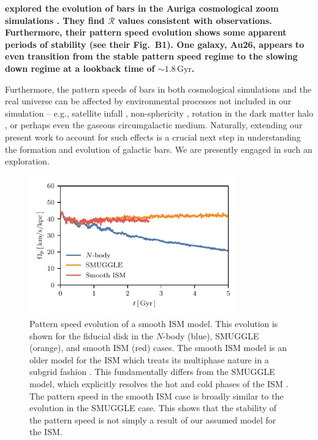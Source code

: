 \documentclass[twocolumn,linenumbers,trackchanges]{aastex631}
\newcommand{\Rot}{\ensuremath{\mathcal{R}}}
\newcommand{\Nbody}{$N$-body}
\newcommand{\SMUGGLE}{SMUGGLE}
\begin{document}
{\bf \citet{2021AA...650L..16F} explored the evolution of bars in the Auriga
cosmological zoom simulations \citep{2017MNRAS.467..179G}. They find \Rot{}
values consistent with observations. Furthermore, their pattern speed evolution
shows some apparent periods of stability (see their Fig.~B1). One galaxy, Au26,
appears to even transition from the stable pattern speed regime to the slowing
down regime at a lookback time of $\sim1.8\,\textrm{Gyr}$.}

Furthermore, the pattern speeds of bars in both cosmological simulations and the
real universe can be affected by environmental processes not included in our
simulation -- e.g., satellite infall \citep{2011Natur.477..301P}, non-sphericity
\citep{2013MNRAS.429.1949A}, rotation in the dark matter halo
\citep{2013MNRAS.434.1287S, 2014ApJ...783L..18L, 2018MNRAS.476.1331C,
2019MNRAS.488.5788C}, or perhaps even the gaseous circumgalactic medium.
Naturally, extending our present work to account for such effects is a crucial
next step in understanding the formation and evolution of galactic bars. We are
presently engaged in such an exploration.

\begin{figure}
    \centering
    \includegraphics[width=9cm]{fig/ps_GFM.pdf}
    \caption{Pattern speed evolution of a smooth ISM model. This evolution is
    shown for the fiducial disk in the \Nbody{} (blue), \SMUGGLE{} (orange), and
    smooth ISM (red) cases. The smooth ISM model is an older model for the ISM
    which treats its multiphase nature in a subgrid fashion
    \citep{2003MNRAS.339..289S}. This fundamentally differs from the \SMUGGLE{}
    model, which explicitly resolves the hot and cold phases of the ISM
    \citep{2019MNRAS.489.4233M}. The pattern speed in the smooth ISM case is
    broadly similar to the evolution in the \SMUGGLE{} case. This shows that the
    stability of the pattern speed is not simply a result of our assumed model
    for the ISM.}
\label{fig:GFM}
\end{figure}
\end{document}
